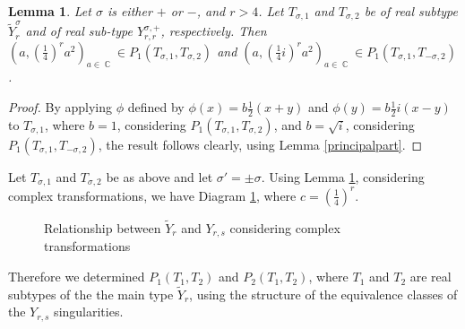 \documentclass[noend]{amsproc}
\newtheorem{lemma}[theorem]{Lemma}
\theoremstyle{definition}
\DeclareMathOperator{\R}{\mathbb{R}}
\DeclareMathOperator{\C}{\mathbb{C}}
\begin{document}
\begin{lemma}\label{equivalences}
Let $\sigma$ is either $+$ or $-$, and $r>4$. Let $T_{\sigma,1}$ and $T_{\sigma,2}$ be of real subtype $\widetilde Y_{r}^{\sigma}$ and of real sub-type $Y_{r,r}^{\sigma,+}$, respectively. Then $\left(a,\left(\frac{1}{4}\right)^{r}a^2\right)_{a\in\C}\in P_1(T_{\sigma,1},T_{\sigma,2})$ and $\left(a,\left(\frac{1}{4}i\right)^{r}a^2\right)_{a\in\C}\in P_1(T_{\sigma,1},T_{-\sigma,2})$.

\end{lemma}
\begin{proof}
By applying $\phi$ defined by $\phi(x)=b\frac{1}{2}(x+y)$ and $\phi(y)=b\frac{1}{2}i(x-y)$ to $T_{\sigma,1}$, where $b=1$, considering $P_1(T_{\sigma,1},T_{\sigma,2})$, and $b=\sqrt{i}$, considering $P_1(T_{\sigma,1},T_{-\sigma,2})$, the result follows clearly, using 
Lemma \ref{principalpart}. 
\end{proof}

Let $T_{\sigma,1}$ and $T_{\sigma,2}$ be as above and let $\sigma'=\pm\sigma$. Using Lemma \ref{equivalences}, considering complex transformations, we have Diagram \ref{Yr_commuting_diagram}, where $c=\left(\frac{1}{4}\right)^r$.

\begin{figure}
\caption{Relationship between $\widetilde Y_r$ and $Y_{r,s}$ considering complex transformations}
\label{Yr_commuting_diagram}
\end{figure}
Therefore we determined $P_1(T_1,T_2)$ and $P_2(T_1,T_2)$, where $T_1$ and $T_2$ are real subtypes of the the main type $\widetilde Y_r$, using the structure of the equivalence classes of the $Y_{r,s}$ singularities. 
\end{document}
